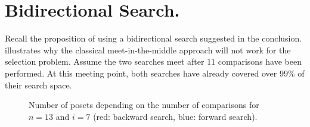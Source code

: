 \documentclass[a4paper,UKenglish,cleveref, autoref, thm-restate]{lipics-v2021}
\begin{document}
\section{Bidirectional Search.}
Recall the proposition of using a bidirectional search suggested in the conclusion.
 illustrates why the classical meet-in-the-middle approach will not work for the selection problem.
Assume the two searches meet after $11$ comparisons have been performed.
At this meeting point, both searches have already covered over $99\%$ of their search space.

\begin{figure}[!b]
  \centering
  
  \caption{Number of posets depending on the number of comparisons for $n = 13$ and $i = 7$ (red: backward search, blue: forward search).}
  \label{fig:backward_forward_count_13_6}
\end{figure}





\end{document}
